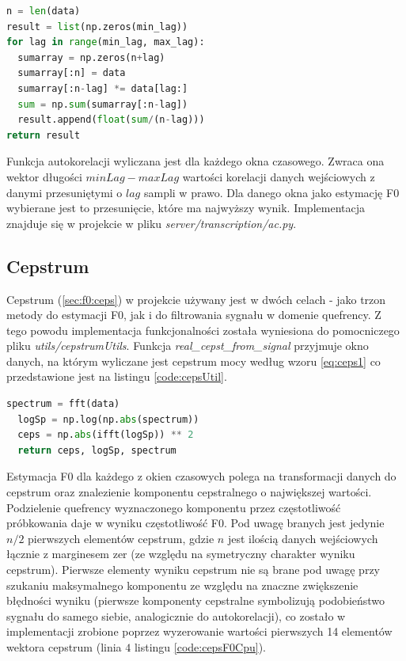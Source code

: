 \documentclass[12pt,a4paper,twoside]{mwart}
\begin{document}
\begin{lstlisting}[language=Python, caption={Funkcja autokorelacji}, captionpos=b, label={code:ac}]
n = len(data)
result = list(np.zeros(min_lag))
for lag in range(min_lag, max_lag):
  sumarray = np.zeros(n+lag)
  sumarray[:n] = data
  sumarray[:n-lag] *= data[lag:]
  sum = np.sum(sumarray[:n-lag])
  result.append(float(sum/(n-lag)))
return result
\end{lstlisting}

Funkcja autokorelacji wyliczana jest dla każdego okna czasowego. Zwraca ona wektor długości $minLag - maxLag$ wartości korelacji danych wejściowych z danymi przesuniętymi o $lag$ sampli w prawo. Dla danego okna jako estymację F0 wybierane jest to przesunięcie, które ma najwyższy wynik. Implementacja znajduje się w projekcie w pliku \textit{server/transcription/ac.py}.

\subsection{Cepstrum}\label{sec:impl:alg:ceps}
Cepstrum (\ref{sec:f0:ceps}) w projekcie używany jest w dwóch celach - jako trzon metody do estymacji F0, jak i do filtrowania sygnału w domenie quefrency. Z tego powodu implementacja funkcjonalności została wyniesiona do pomocniczego pliku \textit{utils/cepstrumUtils}. Funkcja \textit{real\_cepst\_from\_signal} przyjmuje okno danych, na którym wyliczane jest cepstrum mocy według wzoru \ref{eq:ceps1} co przedstawione jest na listingu \ref{code:cepsUtil}.

\begin{lstlisting}[language=Python, caption={Wyliczanie cepstrum mocy}, captionpos=b, label={code:cepsUtil}]
  spectrum = fft(data)
  logSp = np.log(np.abs(spectrum))
  ceps = np.abs(ifft(logSp)) ** 2
  return ceps, logSp, spectrum
\end{lstlisting}

Estymacja F0 dla każdego z okien czasowych polega na transformacji danych do cepstrum oraz znalezienie komponentu cepstralnego o największej wartości. Podzielenie quefrency wyznaczonego komponentu przez częstotliwość próbkowania daje w wyniku częstotliwość F0. Pod uwagę branych jest jedynie $n / 2$ pierwszych elementów cepstrum, gdzie $n$ jest ilością danych wejściowych łącznie z marginesem zer (ze względu na symetryczny charakter wyniku cepstrum). Pierwsze elementy wyniku cepstrum nie są brane pod uwagę przy szukaniu maksymalnego komponentu ze względu na znaczne zwiększenie błędności wyniku (pierwsze komponenty cepstralne symbolizują podobieństwo sygnału do samego siebie, analogicznie do autokorelacji), co zostało w implementacji zrobione poprzez wyzerowanie wartości pierwszych 14 elementów wektora cepstrum (linia $4$ listingu \ref{code:cepsF0Cpu}). 
\end{document}

